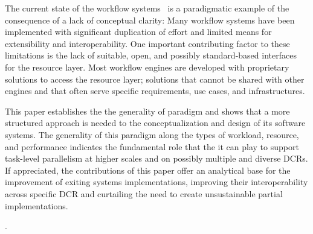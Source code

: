 \documentclass{sig-alternate}
\begin{document}
  The current state of the workflow
systems~\cite{taylor2014} is a paradigmatic example of the consequence of a lack
of conceptual clarity: Many workflow systems have been implemented with
significant duplication of effort and limited means for extensibility and
interoperability. One important contributing factor to these limitations is the
lack of suitable, open, and possibly standard-based interfaces for the resource
layer. Most workflow engines are developed with proprietary solutions to access
the resource layer; solutions that cannot be shared with other engines and that
often serve specific requirements, use cases, and infrastructures.

This paper establishes the the generality of \pilot paradigm and shows that a
more structured approach is needed to the conceptualization
and design of its software systems.
The generality of this paradigm along the types of workload, resource, and
performance indicates the fundamental role that the it can play to support
task-level parallelism at higher scales and on possibly multiple and diverse
DCRs. If appreciated, the contributions of this paper offer an analytical base
for the improvement of exiting \pilot systems implementations, improving their
interoperability across specific DCR and curtailing the need to create
unsustainable partial implementations.

.

\end{document}
